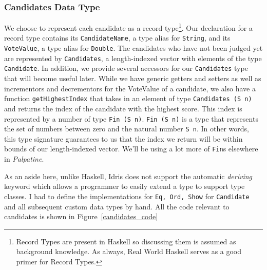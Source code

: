 \subsubsection{Candidates Data Type}

We choose to represent each candidate as a record type\footnote{Record Types are
present in Haskell so discussing them is assumed as background knowledge. As
always, Real World Haskell serves as a good primer for Record Types. }. Our
declaration for a record type contains its \texttt{CandidateName}, a type alias
for \texttt{String}, and its \texttt{VoteValue}, a type alias for
\texttt{Double}. The candidates who have not been judged yet are represented by
\texttt{Candidates}, a length-indexed vector with elements of the type
\texttt{Candidate}. In addition, we provide several accessors for our
\texttt{Candidates} type that will become useful later. While we have generic
getters and setters as well as incrementors and decrementors for the VoteValue
of a candidate, we also have a function \texttt{getHighestIndex} that takes in
an element of type \texttt{Candidates (S n)} and returns the index of the
candidate with the highest score. This index is represented by a number of type
\texttt{Fin (S n)}. \texttt{Fin (S n)} is a type that represents the set of
numbers between zero and the natural number \texttt{S n}. In other words, this
type signature guarantees to us that the index we return will be within bounds
of our length-indexed vector. We'll be using a lot more of \texttt{Fin}s
elsewhere in \textit{Palpatine}. 

As an aside here, unlike Haskell, Idris does not support the automatic
\textit{deriving} keyword which allows a programmer to easily extend a type to
support type classes. I had to define the implementations for \texttt{Eq, Ord,
Show} for \texttt{Candidate} and all subsequent custom data types by hand. All
the code relevant to candidates is shown in Figure~\ref{candidates_code}

